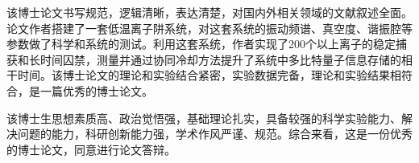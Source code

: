 
\begin{comments}

    该博士论文书写规范，逻辑清晰，表达清楚，对国内外相关领域的文献叙述全面。论文作者搭建了一套低温离子阱系统，对这套系统的振动频谱、真空度、谐振腔等参数做了科学和系统的测试。利用这套系统，作者实现了200个以上离子的稳定捕获和长时间囚禁，测量并通过协同冷却方法提升了系统中多比特量子信息存储的相干时间。该博士论文的理论和实验结合紧密，实验数据完备，理论和实验结果相符合，是一篇优秀的博士论文。
    
    该博士生思想素质高、政治觉悟强，基础理论扎实，具备较强的科学实验能力、解决问题的能力，科研创新能力强，学术作风严谨、规范。综合来看，这是一份优秀的博士论文，同意进行论文答辩。

\end{comments}
